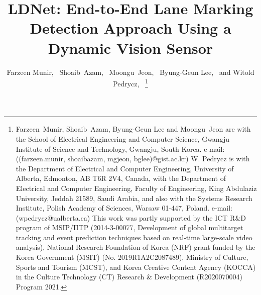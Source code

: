 \documentclass[journal]{IEEEtran}
\begin{document}
\title{LDNet: End-to-End Lane Marking Detection Approach Using a Dynamic Vision Sensor}

\author{Farzeen Munir,~
Shoaib~Azam,~
Moongu~Jeon,~ Byung-Geun Lee,~ and Witold Pedrycz,~ 
\thanks{Farzeen~Munir, Shoaib~Azam, Byung-Geun Lee  and Moongu~Jeon are
with the School of Electrical Engineering and Computer Science,
Gwangju Institute of Science and Technology,
Gwangju, South Korea.
e-mail:((farzeen.munir, shoaibazam, mgjeon, bglee)@gist.ac.kr) 
\newline
W. Pedrycz is with the Department of Electrical and Computer Engineering,
University of Alberta, Edmonton, AB T6R 2V4, Canada, with the Department
of Electrical and Computer Engineering, Faculty of Engineering, King Abdulaziz University, Jeddah 21589, Saudi Arabia, and also with the Systems Research Institute, Polish Academy of Sciences, Warsaw 01-447, Poland. 
\newline
e-mail:(wpedrycz@ualberta.ca)
\newline
This work was partly supported by the ICT R$\&$D program of MSIP/IITP (2014-3-00077, Development of global multitarget tracking and event prediction techniques based on real-time large-scale video analysis), National Research Foundation of Korea (NRF) grant funded by the Korea Government (MSIT) (No. 2019R1A2C2087489), Ministry of Culture, Sports and Tourism (MCST), and Korea Creative Content Agency (KOCCA) in the Culture Technology (CT) Research \& Development (R2020070004) Program 2021.}}

\maketitle
\end{document}
